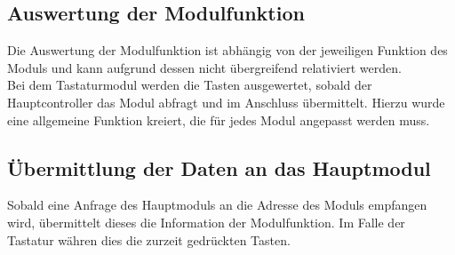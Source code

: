\newpage
\subsection{Auswertung der Modulfunktion}
\textmd{Die Auswertung der Modulfunktion ist abhängig von der jeweiligen Funktion des Moduls und kann aufgrund dessen nicht übergreifend relativiert werden.\\
	Bei dem Tastaturmodul werden die Tasten ausgewertet, sobald der Hauptcontroller das Modul abfragt und im Anschluss übermittelt. Hierzu wurde eine allgemeine Funktion kreiert, die für jedes Modul angepasst werden muss.
}



\subsection{Übermittlung der Daten an das Hauptmodul}
\textmd{Sobald eine Anfrage des Hauptmoduls an die Adresse des Moduls empfangen wird, übermittelt dieses die Information der Modulfunktion. Im Falle der Tastatur währen dies die zurzeit gedrückten Tasten.
}






